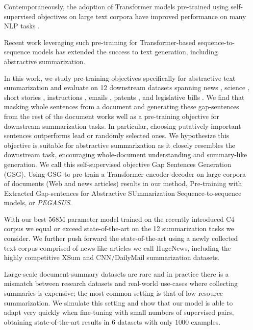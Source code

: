 \documentclass{article}
\newcommand\largemodelsize{568M\xspace}
\newcommand\gnews{HugeNews\xspace}
\begin{document}
Contemporaneously, the adoption of Transformer models \citep{vaswani2017attention} pre-trained using self-supervised
objectives on large text corpora \citep{radford2018improving,devlin_2019} have improved performance on many NLP tasks \citep{Wang_2018,Rajpurkar_2016}.

Recent work leveraging such pre-training for
  Transformer-based sequence-to-sequence models \citep{unilm,song2019mass,rothe2019leveraging,lewis2019bart,raffel2019exploring} has extended the success to text generation, including abstractive summarization.
  
In this work, we study pre-training objectives specifically for abstractive text summarization and evaluate on 12 downstream datasets spanning news \citep{hermann2015cnndm,shashi-2018-xsum,Grusky2018newsroom,rush-etal-2015-neural,fabbri-etal-2019-multinews}, science  \citep{cohan-etal-2018-discourse-scientificpapers}, short stories \citep{kim-etal-2019-reddittifu}, instructions \citep{koupaee2018wikihow}, emails \citep{zhang-tetreault-2019-aeslc}, patents \citep{sharma-etal-2019-bigpatent}, and legislative bills \citep{kornilova-eidelman-2019-billsum}. 
We find that masking whole sentences from a document
and generating these gap-sentences from the rest of the document
works well as a pre-training objective for downstream summarization tasks.
In particular, choosing putatively important sentences outperforms
lead or randomly selected ones.
We hypothesize this objective is suitable for abstractive
summarization as it closely resembles the
downstream task, encouraging whole-document understanding and summary-like generation.
We call this self-supervised objective Gap Sentences Generation (GSG).
Using GSG to pre-train a Transformer encoder-decoder on large corpora of documents (Web and
news articles) results in our method,
Pre-training with Extracted Gap-sentences for Abstractive SUmmarization Sequence-to-sequence models, or \emph{PEGASUS}.

With our best \largemodelsize parameter model trained
on the recently introduced C4 \citep{raffel2019exploring} corpus we equal or exceed state-of-the-art on the 12 summarization
tasks we consider. We further push forward the state-of-the-art using a newly collected text corpus comprised
of news-like articles we call \gnews, 
including the highly competitive XSum and CNN/DailyMail summarization datasets.


Large-scale document-summary datasets are rare and in practice there is a mismatch
between research datasets and real-world use-cases where collecting summaries is 
expensive; the most common setting is that of low-resource summarization. We simulate
this setting and show that our model is able to adapt very quickly when fine-tuning with small numbers
of supervised pairs, obtaining state-of-the-art results in 6 datasets with only 1000 examples.
\end{document}
